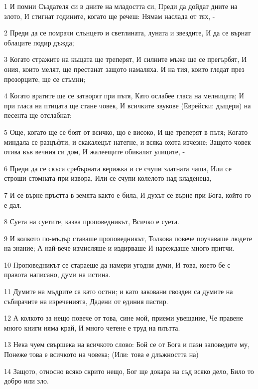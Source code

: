 \par 1 И помни Създателя си в дните на младостта си, Преди да дойдат дните на злото, И стигнат годините, когато ще речеш: Нямам наслада от тях, -
\par 2 Преди да се помрачи слънцето и светлината, луната и звездите, И да се върнат облаците подир дъжда;
\par 3 Когато стражите на къщата ще треперят, И силните мъже ще се прегърбят, И ония, които мелят, ще престанат защото намаляха. И на тия, които гледат през прозорците, ще се стъмни;
\par 4 Когато вратите ще се затворят при пътя, Като ослабее гласа на мелницата; И при гласа на птицата ще стане човек, И всичките звукове (Еврейски: дъщери) на песента ще отслабнат;
\par 5 Още, когато ще се боят от всичко, що е високо, И ще треперят в пътя; Когато миндала се разцъфти, и скакалецът натегне, и всяка охота изчезне; Защото човек отива във вечния си дом, И жалеещите обикалят улиците, -
\par 6 Преди да се скъса сребърната верижка и се счупи златната чаша, Или се строши стомната при извора, Или се счупи колелото над кладенеца,
\par 7 И се върне пръстта в земята както е била, И духът се върне при Бога, който го е дал.
\par 8 Суета на суетите, казва проповедникът, Всичко е суета.
\par 9 И колкото по-мъдър ставаше проповедникът, Толкова повече поучаваше людете на знание; А най-вече измисляше и издирваше И нареждаше много притчи.
\par 10 Проповедникът се стараеше да намери угодни думи, И това, което бе с правота написано, думи на истина.
\par 11 Думите на мъдрите са като остни; и като заковани гвоздеи са думите на  събирачите на изреченията, Дадени от единия пастир.
\par 12 А колкото за нещо повече от това, сине мой, приеми увещание, Че правене много книги няма край, И много четене е труд на плътта.
\par 13 Нека чуем свършека на всичкото слово: Бой се от Бога и пази  заповедите му, Понеже това е всичкото на човека; (Или: това е длъжността на)
\par 14 Защото, относно всяко скрито нещо, Бог ще докара на съд всяко дело, Било то добро или зло.

